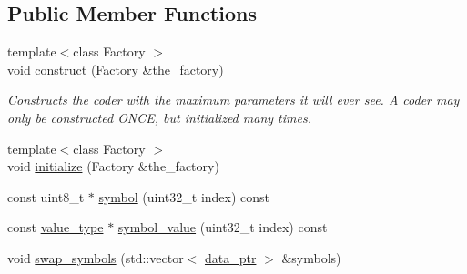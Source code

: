 \subsection*{Public Member Functions}
\begin{DoxyCompactItemize}
\item 
{\footnotesize template$<$class Factory $>$ }\\void \hyperlink{classkodo_1_1shallow__symbol__storage_ab4f4f9e3bb77985fcec086c2d4a69241}{construct} (Factory \&the\-\_\-factory)
\begin{DoxyCompactList}\small\item\em Constructs the coder with the maximum parameters it will ever see. A coder may only be constructed O\-N\-C\-E, but initialized many times. \end{DoxyCompactList}\item 
{\footnotesize template$<$class Factory $>$ }\\void \hyperlink{classkodo_1_1shallow__symbol__storage_a21f1903f4564293c690f743c07f52332}{initialize} (Factory \&the\-\_\-factory)
\begin{DoxyCompactList}\small\item\em \end{DoxyCompactList}\item 
const uint8\-\_\-t $\ast$ \hyperlink{classkodo_1_1shallow__symbol__storage_a83b85d9c28f40abc61d29e38ce13cdfd}{symbol} (uint32\-\_\-t index) const 
\begin{DoxyCompactList}\small\item\em \end{DoxyCompactList}\item 
const \hyperlink{classkodo_1_1shallow__symbol__storage_abb7de59459d66e0eeb8a6406b074122f}{value\-\_\-type} $\ast$ \hyperlink{classkodo_1_1shallow__symbol__storage_a0b3708527a1ef948ec1d3bdce249bb14}{symbol\-\_\-value} (uint32\-\_\-t index) const 
\begin{DoxyCompactList}\small\item\em \end{DoxyCompactList}\item 
void \hyperlink{classkodo_1_1shallow__symbol__storage_abd29317187f5321dd58d94ac315ecb0f}{swap\-\_\-symbols} (std\-::vector$<$ \hyperlink{classkodo_1_1shallow__symbol__storage_ae30b89454fcd5e9d9afd516ffc103753}{data\-\_\-ptr} $>$ \&symbols)
\begin{DoxyCompactList}\small\item\em \end{DoxyCompactList}\item 

\end{DoxyCompactItemize}
